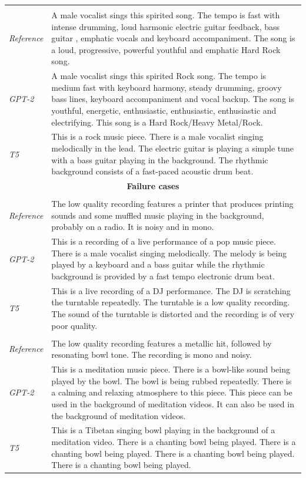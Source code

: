 \begin{table}[ht]
\begin{tabularx}{\textwidth}{lX}
\multicolumn{2}{l}{} \\[-0.5em]
\textit{Reference} & A male vocalist sings this spirited song. The tempo is fast with intense drumming, loud harmonic electric guitar feedback, bass guitar , emphatic vocals and keyboard accompaniment. The song is a loud, progressive, powerful youthful and emphatic Hard Rock song. \\
\textit{GPT-2} & A male vocalist sings this spirited Rock song. The tempo is medium fast with keyboard harmony, steady drumming, groovy bass lines, keyboard accompaniment and vocal backup. The song is youthful, energetic, enthusiastic, enthusiastic, enthusiastic and electrifying. This song is a Hard Rock/Heavy Metal/Rock. \\
\textit{T5} & This is a rock music piece. There is a male vocalist singing melodically in the lead. The electric guitar is playing a simple tune with a bass guitar playing in the background. The rhythmic background consists of a fast-paced acoustic drum beat. \\
\midrule

\multicolumn{2}{c}{\textbf{Failure cases}} \\
\midrule
\multicolumn{2}{l}{} \\[-0.5em]
\textit{Reference} & The low quality recording features a printer that produces printing sounds and some muffled music playing in the background, probably on a radio. It is noisy and in mono. \\
\textit{GPT-2} & This is a recording of a live performance of a pop music piece. There is a male vocalist singing melodically. The melody is being played by a keyboard and a bass guitar while the rhythmic background is provided by a fast tempo electronic drum beat. \\
\textit{T5} & This is a live recording of a DJ performance. The DJ is scratching the turntable repeatedly. The turntable is a low quality recording. The sound of the turntable is distorted and the recording is of very poor quality. \\
\midrule

\multicolumn{2}{l}{} \\[-0.5em]
\textit{Reference} & The low quality recording features a metallic hit, followed by resonating bowl tone. The recording is mono and noisy. \\
\textit{GPT-2} & This is a meditation music piece. There is a bowl-like sound being played by the bowl. The bowl is being rubbed repeatedly. There is a calming and relaxing atmosphere to this piece. This piece can be used in the background of meditation videos. It can also be used in the background of meditation videos. \\
\textit{T5} & This is a Tibetan singing bowl playing in the background of a meditation video. There is a chanting bowl being played. There is a chanting bowl being played. There is a chanting bowl being played. There is a chanting bowl being played. \\
\midrule


\end{tabularx}
\end{table}
